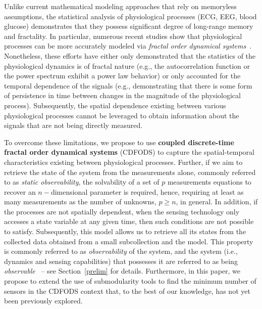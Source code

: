 Unlike current mathematical modeling approaches that rely on memoryless assumptions, the statistical analysis of physiological processes (ECG, EEG, blood glucose) demonstrates that they possess significant degree of long-range memory and fractality. In particular, numerous recent studies show that physiological processes can be more accurately modeled via \emph{fractal order dynamical systems}~\cite{moon1992chaotic,piramideCortexFractal,surveyFractalNeuro,ecgFractal,Thurner2003511}.  Nonetheless, these efforts have either only demonstrated that the statistics of the physiological dynamics is of fractal nature (e.g., the autocorrelation function or the power spectrum exhibit a power law behavior) or only accounted for the temporal dependence of the signals (e.g., demonstrating that there is some form of persistence in time between changes in the magnitude of the physiological process). Subsequently, the spatial dependence existing between various physiological processes cannot be leveraged to obtain information about the signals that are not being directly measured. 

To overcome these limitations, we propose to use \textbf{coupled discrete-time fractal order dynamical systems} (CDFODS) to capture the spatial-temporal characteristics existing between physiological processes. Further, if we aim to retrieve the state of the system from the measurements alone, commonly referred to as \emph{static observability},  the solvability of a set of $p$ measurements equations to recover an $n-$dimensional parameter is required, hence, requiring at least as many measurements as the number of unknowns, $p\ge n$, in general. In addition, if the processes are not spatially dependent, when the sensing technology only accesses a state variable at any given time, then such conditions are not possible to satisfy.  Subsequently, this model allows us to retrieve all its states from the collected data obtained from a small subcollection and the model. This property is commonly referred to as \emph{observability} of the system, and the system (i.e., dynamics and sensing capabilities) that possesses it are referred to as being \emph{observable}~\cite{fracOrderdiscrete} -- see Section~\ref{prelim} for details. Furthermore, in this paper, we propose to extend the use of submodularity tools to find the minimum number of sensors in the CDFODS context that, to the best of our knowledge, has not yet been previously explored. 


